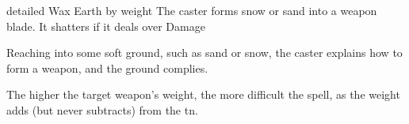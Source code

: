   {detailed}%
  {Wax}%
  {Earth}%
  {by \gls{weight}}%
  {The caster forms snow or sand into a weapon blade. It shatters if it deals over  Damage}%
  {
    Reaching into some soft ground, such as sand or snow, the caster explains how to form a weapon, and the ground complies.

    The higher the target weapon's \gls{weight}, the more difficult the spell, as the \gls{weight} adds (but never subtracts) from the \gls{tn}.
  }
